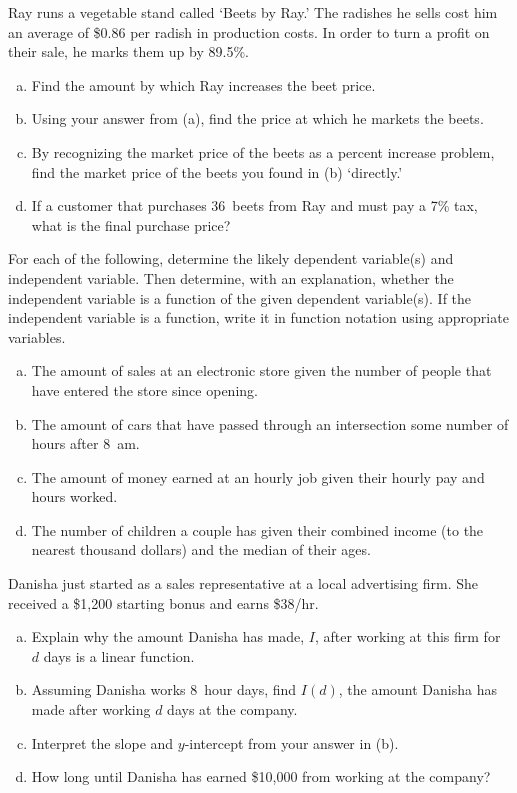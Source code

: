 \documentclass[11pt,letterpaper]{article}
\begin{document}

 Ray runs a vegetable stand called `Beets by Ray.' The radishes he sells cost him an average of \$0.86 per radish in production costs. In order to turn a profit on their sale, he marks them up by 89.5\%.
	\begin{enumerate}[(a)]
	\item Find the amount by which Ray increases the beet price.
	\item Using your answer from (a), find the price at which he markets the beets.
	\item By recognizing the market price of the beets as a percent increase problem, find the market price of the beets you found in (b) `directly.'
	\item If a customer that purchases 36~beets from Ray and must pay a 7\% tax, what is the final purchase price?
	\end{enumerate}



\newpage



 For each of the following, determine the likely dependent variable(s) and independent variable. Then determine, with an explanation, whether the independent variable is a function of the given dependent variable(s). If the independent variable is a function, write it in function notation using appropriate variables. 
	\begin{enumerate}[(a)]
	\item The amount of sales at an electronic store given the number of people that have entered the store since opening. 
	\item The amount of cars that have passed through an intersection some number of hours after 8~am.
	\item The amount of money earned at an hourly job given their hourly pay and hours worked.
	\item The number of children a couple has given their combined income (to the nearest thousand dollars) and the median of their ages. 
	\end{enumerate}



\newpage



 Danisha just started as a sales representative at a local advertising firm. She received a \$1,200 starting bonus and earns \$38/hr. 
	\begin{enumerate}[(a)]
	\item Explain why the amount Danisha has made, $I$, after working at this firm for $d$ days is a linear function.
	\item Assuming Danisha works 8~hour days, find $I(d)$, the amount Danisha has made after working $d$ days at the company. 
	\item Interpret the slope and $y$-intercept from your answer in (b). 
	\item How long until Danisha has earned \$10,000 from working at the company?
	\end{enumerate}
\end{document}
